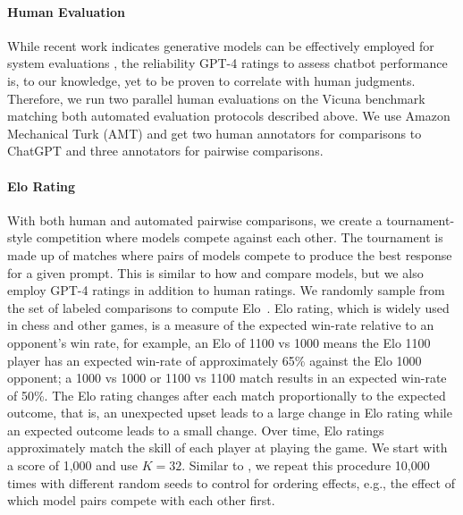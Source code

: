 \paragraph{Human Evaluation}
While recent work indicates generative models can be effectively employed for system evaluations \citep{fu2023gptscore}, the reliability GPT-4 ratings to assess chatbot performance is, to our knowledge, yet to be proven to correlate with human judgments. Therefore, we run two parallel human evaluations on the Vicuna benchmark matching both automated evaluation protocols described above. We use Amazon Mechanical Turk (AMT) and get two human annotators for comparisons to ChatGPT and three annotators for pairwise comparisons. 

\paragraph{Elo Rating}
With both human and automated pairwise comparisons, we create a tournament-style competition where models compete against each other. The tournament is made up of matches where pairs of models compete to produce the best response for a given prompt. This is similar to how \citet{bai2022training} and \citet{vicuna2023} compare models, but we also employ GPT-4 ratings in addition to human ratings. We randomly sample from the set of labeled comparisons to compute Elo~\citep{elo1967proposed,elo1978rating}. Elo rating, which is widely used in chess and other games, is a measure of the expected win-rate relative to an opponent's win rate, for example, an Elo of 1100 vs 1000 means the Elo 1100 player has an expected win-rate of approximately 65\% against the Elo 1000 opponent; a 1000 vs 1000 or 1100 vs 1100 match results in an expected win-rate of 50\%. The Elo rating changes after each match proportionally to the expected outcome, that is, an unexpected upset leads to a large change in Elo rating while an expected outcome leads to a small change. Over time, Elo ratings approximately match the skill of each player at playing the game. We start with a score of 1,000 and use $K=32$. Similar to \citet{vicuna2023}, we repeat this procedure 10,000 times with different random seeds to control for ordering effects, e.g., the effect of which model pairs compete with each other first.

